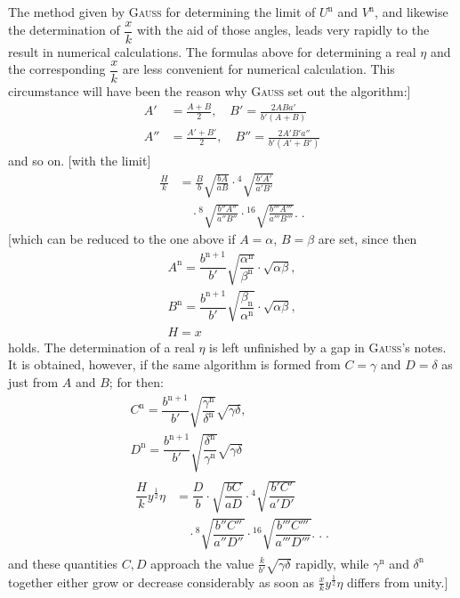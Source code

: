 The method given by \textsc{Gauss} for determining the limit of
$U^{\mathrm n}$ and $V^{\mathrm n}$, and likewise the determination of $\dfrac xk$ with the aid of those angles, leads very rapidly to the result in numerical calculations. The formulas above for determining a real $\eta$ and the corresponding $\dfrac xk$ are less convenient for numerical calculation. This circumstance will have been the reason why \textsc{Gauss} set out the algorithm:]
\[
\begin{aligned}
A'&=\frac{A+B}{2},\quad B'=\frac{2ABa'}{b'(A+B)}\\
A''&=\frac{A'+B'}{2},\quad B''=\frac{2A'B'a''}{b'(A'+B')}
\end{aligned}
\]
and so on. [with the limit]
\[
\begin{aligned}\frac Hk&=\frac Bb\surd{\frac{bA}{aB}}
\cdot{}^{4}\!\surd{\frac{b'A'}{a'B'}}
\\&\quad\cdot{}^{8}\!\surd{\frac{b''A''}{a''B''}}
\cdot{}^{16}\!\surd{\frac{b'''A'''}{a'''B'''}}.\;.\end{aligned}
\]
[which can be reduced to the one above if
$A=\alpha$, $B=\beta$ are set, since then
\[
\begin{gathered}A^{\mathrm n}=\dfrac{b^{\mathrm n+1}}{b'}\surd{\dfrac{\alpha^{\mathrm n}}{\beta^{\mathrm n}}}\cdot\surd{\alpha\beta},\\[9pt]
B^{\mathrm n}=\dfrac{b^{\mathrm n+1}}{b'}\surd{\dfrac{\beta_{\mathrm n}}{\alpha^{\mathrm n}}}\cdot\surd{\alpha\beta},\\[9pt] H=x\end{gathered}
\]
holds. The determination of a real $\eta$ is left unfinished by a gap in \textsc{Gauss}'s notes. It is obtained, however, if the same algorithm is formed from $C=\gamma$ and $D=\delta$ as just from $A$ and $B$; for then:
\[
\begin{gathered}
C^{\mathrm n}=\dfrac{b^{\mathrm n+1}}{b'}\surd{\dfrac{\gamma^{\mathrm n}}{\delta^{\mathrm n}}}\surd{\gamma\delta},\\[7pt]
D^{\mathrm n}=\dfrac{b^{\mathrm n+1}}{b'}\surd{\dfrac{\delta^{\mathrm n}}{\gamma^{\mathrm n}}}\surd{\gamma\delta}\\
\begin{aligned}\dfrac{H}{k}y^{\frac12}\eta&=\dfrac{D}{b}\cdot\surd{\dfrac{bC}{aD}}\cdot
{}^{4}\!\surd{\dfrac{b'C'}{a'D'}}\\&\quad\cdot{}^{8}\!\surd{\dfrac{b''C''}{a''D''}}\cdot
{}^{16}\!\surd{\dfrac{b'''C'''}{a'''D'''}}.\;.\;.\end{aligned}\end{gathered}
\]
and these quantities $C,\allowbreak D$ approach the value $\frac{k}{b'}\surd{\gamma\delta}$ rapidly, while $\gamma^{\mathrm n}$ and $\delta^{\mathrm n}$ together either grow or decrease considerably as soon as $\frac{x}{k}y^{\frac12}\eta$ differs from unity.]

\clearpage
\endgroup
